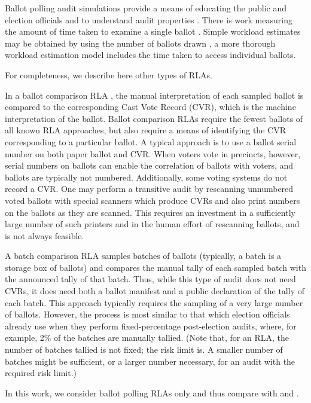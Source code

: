 Ballot polling audit simulations provide a means of educating the public and election officials \cite{dice} and to understand audit properties \cite{mclaughlin_thesis,simulations_house, blom_IRV, DBLP:conf/evoteid/HuangRSTV20}. There is work measuring the amount of time taken to examine a single ballot \cite{RI-report}. 
Simple workload estimates may be obtained by using the number of ballots drawn \cite{bernoulli-ballot-polling}, a more thorough workload estimation model includes the time taken to access individual ballots\cite{bernhard-diss}. 

For completeness, we describe here other types of RLAs. 
\begin{description}
\item In a ballot comparison RLA \cite{RLA}, the manual interpretation of each sampled ballot is compared to the corresponding Cast Vote Record (CVR), which is the machine interpretation of the ballot. Ballot comparison RLAs require the fewest ballots of all known RLA approaches, but also require a means of identifying the CVR corresponding to a particular ballot. A typical approach is to use a ballot serial number on both paper ballot and CVR. When voters vote in precincts, however, serial numbers on ballots can enable the correlation of ballots with voters, and ballots are typically not numbered. Additionally, some voting systems do not record a CVR. One may perform a transitive audit by rescanning unnumbered voted ballots with special scanners which produce CVRs and also print numbers on the ballots as they are scanned. This requires an investment in a sufficiently large number of such printers and in the human effort of rescanning ballots, and is not always feasible. 
\item A batch comparison RLA \cite{RI-report} samples batches of ballots (typically, a batch is a storage box of ballots) and compares the manual tally of each sampled batch with the announced tally of that batch. Thus, while this type of audit does not need CVRs, it does need both a ballot manifest and a public declaration of the tally of each batch. This approach typically requires the sampling of a very large number of ballots. However, the process is most similar to that which election officials already use when they perform fixed-percentage post-election audits, where, for example, 2\% of the batches are manually tallied. (Note that, for an RLA, the number of batches tallied is not fixed; the risk limit is. A smaller number of batches might be sufficient, or a larger number necessary, for an audit with the required risk limit.)
\end{description}

In this work, we consider ballot polling RLAs only and thus compare \Providence with \BRAVO and \Minerva.
